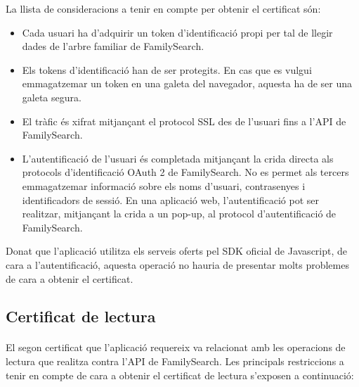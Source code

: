     La llista de consideracions a tenir en compte per obtenir el certificat són:

    \begin{itemize}
        \item Cada usuari ha d'adquirir un token d'identificació propi per tal de llegir dades de l'arbre familiar de FamilySearch.
        \item Els tokens d'identificació han de ser protegits. En cas que es vulgui emmagatzemar un token en una galeta del navegador, aquesta ha de ser una galeta segura.
        \item El tràfic és xifrat mitjançant el protocol SSL des de l'usuari fins a l'API de FamilySearch.
        \item L'autentificació de l'usuari és completada mitjançant la crida directa als protocols d'identificació OAuth 2 de FamilySearch. No es permet als tercers emmagatzemar informació sobre els noms d'usuari, contrasenyes i identificadors de sessió. En una aplicació web, l'autentificació pot ser realitzar, mitjançant la crida a un pop-up, al protocol d'autentificació de FamilySearch.
    \end{itemize}

    Donat que l'aplicació utilitza els serveis oferts pel SDK oficial de Javascript, de cara a l'autentificació, aquesta operació no hauria de presentar molts problemes de cara a obtenir el certificat.


    \subsection{Certificat de lectura}

    \paragraph{}
    El segon certificat que l'aplicació requereix va relacionat amb les operacions de lectura que realitza contra l'API de FamilySearch. Les principals restriccions a tenir en compte de cara a obtenir el certificat de lectura s'exposen a continuació:

